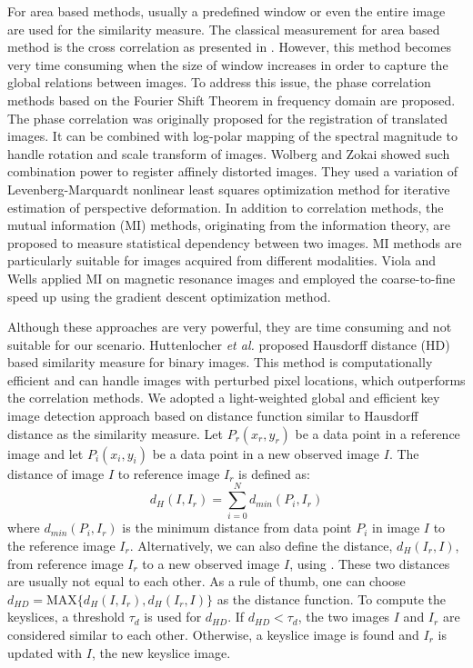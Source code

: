 For area based methods, usually a predefined window or even the entire image
are used for the similarity measure.
The classical measurement for area based method is the cross
correlation as presented in \cite{DIP_Pratt}.
However, this method becomes very time consuming when the size of window
increases in order to capture the global relations between images.
To address this issue, the phase correlation methods
based on the Fourier Shift Theorem
in frequency domain are proposed.
The phase correlation was originally proposed for the registration of translated images.
It can be combined with log-polar mapping of the spectral magnitude
to handle rotation and scale transform of images.
Wolberg and Zokai \cite{DIP_WZ} showed such combination power to register
affinely distorted images.
They used a variation of Levenberg-Marquardt nonlinear least squares
optimization method for iterative estimation of perspective deformation.
In addition to correlation methods,
the mutual information (MI) methods, originating from the information
theory, are proposed to measure statistical dependency between two images.
MI methods are particularly suitable for images acquired from different modalities.
Viola and Wells \cite{DIP_VW} applied MI on magnetic resonance images
and employed the coarse-to-fine speed up using the gradient descent
optimization method.

Although these approaches are very powerful, they are time consuming and
not suitable for our scenario.
Huttenlocher {\it et al.} \cite{IR_HKR} proposed Hausdorff distance (HD)
based similarity measure for binary images.
This method is computationally efficient and
can handle images with perturbed pixel locations,
which outperforms the correlation methods.
We adopted a light-weighted global and efficient key image detection approach
based on distance function similar to
Hausdorff distance as the similarity measure.
Let $P_r(x_r, y_r)$ be a data point in a reference image and
let $P_i(x_i, y_i)$ be a data point in a new observed image $I$.
The distance of image $I$ to reference image $I_r$ is defined as:
\begin{equation}
d_H(I, I_r) = \sum_{i=0}^Nd_{min}(P_i, I_r)
\label{eq:hd}
\end{equation}
where $d_{min}(P_i, I_r)$ is the minimum distance from data point $P_i$
in image $I$ to the reference image $I_r$.
Alternatively, we can also define the distance, $d_H(I_r, I)$,
from reference image $I_r$ to a new observed image $I$, using .
These two distances are usually not equal to each other.
As a rule of thumb, one can choose
$d_{HD} = \text{MAX}\{d_H(I, I_r), d_H(I_r, I)\}$ as the distance function.
To compute the keyslices, a threshold $\tau_d$ is used for  $d_{HD}$.
If $d_{HD} < \tau_d$, the two images $I$ and $I_r$ are considered
similar to each other.
Otherwise, a keyslice image is found and $I_r$ is updated with $I$,
the new keyslice image.


